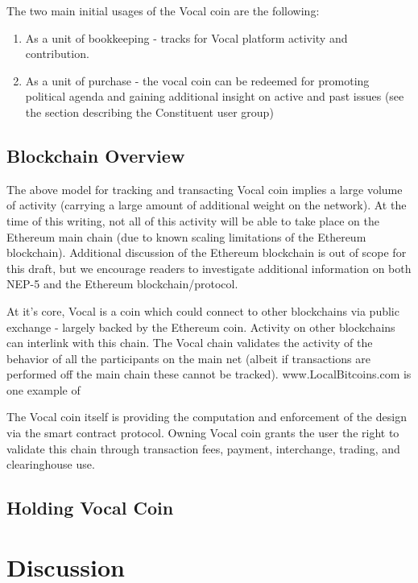 \documentclass[conference]{IEEEtran}
\begin{document}
    The two main initial usages of the Vocal coin are the following:

    \begin{enumerate}
      \item As a unit of bookkeeping - tracks for Vocal platform activity and contribution.
      \item As a unit of purchase - the vocal coin can be redeemed for promoting political agenda and gaining additional insight on active and past issues (see the section describing the Constituent user group)
    \end{enumerate}

    \subsection{Blockchain Overview}

    The above model for tracking and transacting Vocal coin implies a large volume of activity (carrying a large amount of additional weight on the network). At the time of this writing, not all of this activity will be able to take place on the Ethereum main chain (due to known scaling limitations of the Ethereum blockchain). Additional discussion of the Ethereum blockchain is out of scope for this draft, but we encourage readers to investigate additional information on both NEP-5 and the Ethereum blockchain/protocol.

   At it's core, Vocal is a coin which could connect to other blockchains via public exchange - largely backed by the Ethereum coin. Activity on other blockchains can interlink with this chain. The Vocal chain validates the activity of the behavior of all the participants on the main net (albeit if transactions are performed off the main chain these cannot be tracked). www.LocalBitcoins.com is one example of

    The Vocal coin itself is providing the computation and enforcement of the design via the smart contract protocol. Owning Vocal coin grants the user the right to validate this chain through transaction fees, payment, interchange, trading, and clearinghouse use. 

    \subsection{Holding Vocal Coin}

    \section{Discussion}
\end{document}

